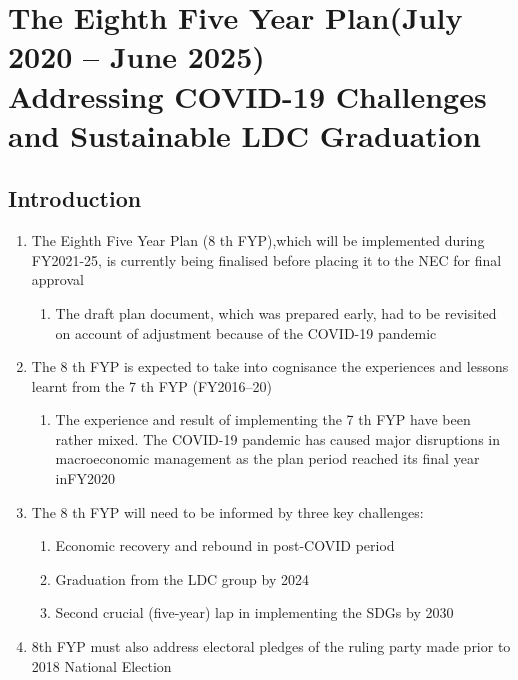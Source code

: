 \documentclass[a4paper,12pt]{book}
\begin{document}
\chapter{The Eighth Five Year Plan(July
2020 – June 2025)\\
Addressing COVID-19 Challenges and
Sustainable LDC Graduation}
\section{Introduction}
\begin{enumerate}
   \item The Eighth Five Year Plan (8
th FYP),which will be implemented during FY2021-25, is
currently being finalised before placing it to the NEC for final approval
   
   \begin{enumerate}
     \item The draft plan document, which was prepared early, had to be revisited on account of adjustment because of the COVID-19 pandemic   
       \end{enumerate}
       \item The 8 th FYP is expected to take into cognisance the experiences and lessons learnt from the 7 th FYP (FY2016–20)
\begin{enumerate}
     \item The experience and result of implementing the 7 th FYP have been rather mixed. The COVID-19 pandemic has caused major disruptions in macroeconomic management as the plan period reached its final year inFY2020   
       \end{enumerate}
       \item The 8 th FYP will need to be informed by three key challenges:

      \begin{enumerate}
     \item Economic recovery and rebound in post-COVID period
     \item Graduation from the LDC group by 2024
     \item Second crucial (five-year) lap in implementing the SDGs by 2030
       \end{enumerate}
       \item 8th FYP must also address electoral pledges of the ruling party made prior to 2018 National Election
     \end{enumerate}
     
\end{document}
